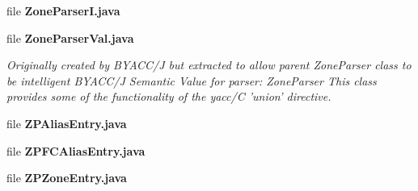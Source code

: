 \begin{DoxyCompactItemize}
file {\bf Zone\+Parser\+I.\+java}
\item 
file {\bf Zone\+Parser\+Val.\+java}
\begin{DoxyCompactList}\small\item\em Originally created by B\+Y\+A\+C\+C/\+J but extracted to allow parent Zone\+Parser class to be intelligent B\+Y\+A\+C\+C/\+J Semantic Value for parser\+: Zone\+Parser This class provides some of the functionality of the yacc/\+C 'union' directive. \end{DoxyCompactList}\item 
file {\bf Z\+P\+Alias\+Entry.\+java}
\item 
file {\bf Z\+P\+F\+C\+Alias\+Entry.\+java}
\item 
file {\bf Z\+P\+Zone\+Entry.\+java}
\end{DoxyCompactItemize}

